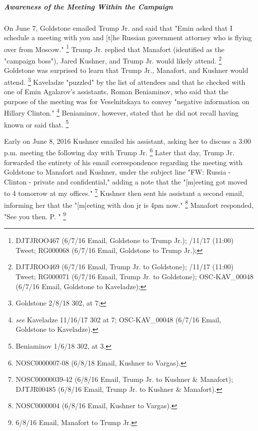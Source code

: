 \subparagraph{Awareness of the Meeting Within the Campaign}

On June 7, Goldstone emailed Trump Jr. and said that "Emin asked that I schedule a meeting with you and [t]he Russian government attorney who is flying over from Moscow."%
\footnote{DJTJROO467 (6/7/16 Email, Goldstone to Trump Jr.); 
/11/17 (11:00) Tweet; 
RG000068 (6/7/16 Email, Goldstone to Trump Jr.);
}
Trump Jr. replied that Manafort (identified as the "campaign boss"), Jared Kushner, and Trump Jr. would likely attend.%
\footnote{DJTJROO469 (6/7/16 Email, Trump Jr. to Goldstone); 
/11/17 (11:00) Tweet; 
RG000071 (6/7/16 Email, Trump Jr. to Goldstone); 
OSC-KAV\_00048 (6/7/16 Email, Goldstone to Kaveladze); 
}
Goldstone was surprised to learn that Trump Jr., Manafort, and Kushner would attend.%
\footnote{Goldstone 2/8/18 302, at 7;
}
Kaveladze 
"puzzled" by the list of attendees and that he checked with one of Emin Agalarov's assistants, Roman Beniaminov, who said that the purpose of the meeting was for Veselnitskaya to convey "negative information on Hillary Clinton."%
\footnote{ \textit{see} Kaveladze 11/16/17 302 at 7; 
OSC-KAV\_00048 (6/7/16 Email, Goldstone to Kaveladze).}
Beniaminov, however, stated that he did not recall having known or said that.%
\footnote{Beniaminov 1/6/18 302, at 3.}

Early on June 8, 2016 Kushner emailed his assistant, asking her to discuss a 3:00 p.m. meeting the following day with Trump Jr.%
\footnote{NOSC0000007-08 (6/8/18 Email, Kushner to Vargas).}
Later that day, Trump Jr. forwarded the entirety of his email correspondence regarding the meeting with Goldstone to Manafort and Kushner, under the subject line "FW: Russia - Clinton - private and confidential," adding a note that the "[m]eeting got moved to 4 tomorrow at my offices."%
\footnote{NOSC00000039-42 (6/8/16 Email, Trump Jr. to Kushner & Manafort); 
DJTJR00485 (6/8/16 Email, Trump Jr. to Kushner & Manafort).}
Kushner then sent his assistant a second email, informing her that the "[m]eeting with don jr is 4pm now."%
\footnote{NOSC0000004 (6/8/16 Email, Kushner to Vargas).}
Manafort responded, "See you then. P. "%
\footnote{6/8/16 Email, Manafort to Trump Jr.}

